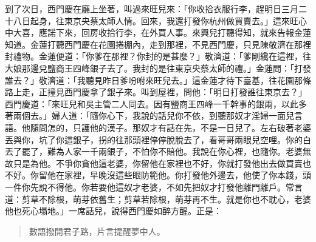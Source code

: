 到了次日，西門慶在廳上坐著，叫過來旺兒來：「你收拾衣服行李，趕明日三月二十八日起身，往東京央蔡太師人情。回來，我還打發你杭州做買賣去。」這來旺心中大喜，應諾下來，回房收拾行李，在外買人事。來興兒打聽得知，就來告報金蓮知道。金蓮打聽西門慶在花園捲棚內，走到那裡，不見西門慶，只見陳敬濟在那裡封禮物。金蓮便道：「你爹在那裡？你封的是甚麼？」敬濟道：「爹剛纔在這裡，往大娘那邊兌鹽商王四峰銀子去了。我封的是往東京央蔡太師的禮。」金蓮問：「打發誰去？」敬濟道：「我聽見昨日爹吩咐來旺兒去。」這金蓮才待下臺基，往花園那條路上走，正撞見西門慶拿了銀子來。叫到屋裡，問他：「明日打發誰往東京去？」西門慶道：「來旺兒和吳主管二人同去。因有鹽商王四峰一千幹事的銀兩，以此多著兩個去。」婦人道：「隨你心下，我說的話兒你不依，到聽那奴才淫婦一面兒言語。他隨問怎的，只護他的漢子。那奴才有話在先，不是一日兒了。左右破著老婆丟與你，坑了你這銀子，拐的往那頭裡停停脫脫去了，看哥哥兩眼兒空哩。你的白丟了罷了，難為人家一千兩銀子，不怕你不賠他。我說在你心裡，也隨你。老婆無故只是為他。不爭你貪他這老婆，你留他在家裡也不好，你就打發他出去做買賣也不好。你留他在家裡，早晚沒這些眼防範他。你打發他外邊去，他使了你本錢，頭一件你先說不得他。你若要他這奴才老婆，不如先把奴才打發他離門離戶。常言道：剪草不除根，萌芽依舊生；剪草若除根，萌芽再不生。就是你也不耽心，老婆他也死心塌地。」一席話兒，說得西門慶如醉方醒。正是：
\begin{quote}
數語撥開君子路，片言提醒夢中人。
\end{quote}
